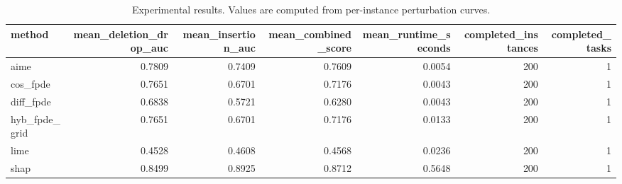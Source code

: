 \begin{table}[t]
\caption{Experimental results. Values are computed from per-instance perturbation curves.}
\label{tab:main_results_computed}
\centering
\begin{tabular}{lrrrrrr}
\toprule
method & mean\_deletion\_drop\_auc & mean\_insertion\_auc & mean\_combined\_score & mean\_runtime\_seconds & completed\_instances & completed\_tasks \\
\midrule
aime & 0.7809 & 0.7409 & 0.7609 & 0.0054 & 200 & 1 \\
cos\_fpde & 0.7651 & 0.6701 & 0.7176 & 0.0043 & 200 & 1 \\
diff\_fpde & 0.6838 & 0.5721 & 0.6280 & 0.0043 & 200 & 1 \\
hyb\_fpde\_grid & 0.7651 & 0.6701 & 0.7176 & 0.0133 & 200 & 1 \\
lime & 0.4528 & 0.4608 & 0.4568 & 0.0236 & 200 & 1 \\
shap & 0.8499 & 0.8925 & 0.8712 & 0.5648 & 200 & 1 \\
\bottomrule
\end{tabular}

\end{table}
